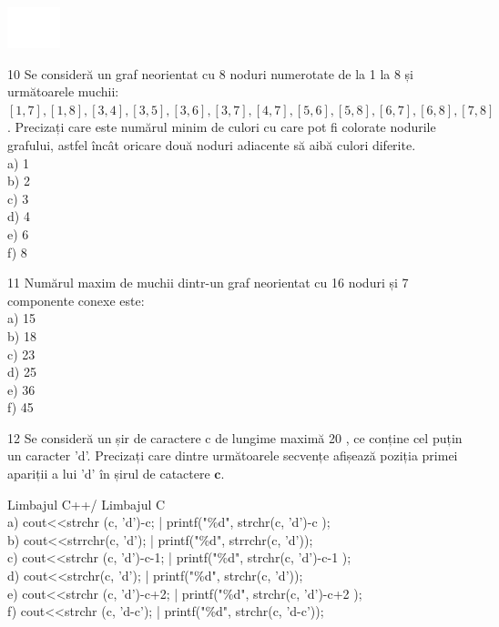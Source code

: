 \documentclass[10pt]{article}
\begin{document}
\includegraphics[max width=\textwidth, center]{2025_04_17_46e04c6acd873ea9558dg-016}

10 Se consideră un graf neorientat cu 8 noduri numerotate de la 1 la 8 și următoarele muchii: $[1,7],[1,8],[3,4],[3,5],[3,6],[3,7],[4,7],[5,6],[5,8],[6,7],[6,8],[7,8]$. Precizați care este numărul minim de culori cu care pot fi colorate nodurile grafului, astfel încât oricare două noduri adiacente să aibă culori diferite.\\
a) 1\\
b) 2\\
c) 3\\
d) 4\\
e) 6\\
f) 8

11 Numărul maxim de muchii dintr-un graf neorientat cu 16 noduri și 7 componente conexe este:\\
a) 15\\
b) 18\\
c) 23\\
d) 25\\
e) 36\\
f) 45

12 Se consideră un șir de caractere c de lungime maximă 20 , ce conține cel puțin un caracter 'd'. Precizați care dintre următoarele secvențe afișează poziția primei apariții a lui 'd' în șirul de catactere $\mathbf{c}$.

Limbajul C++/ Limbajul C\\
a) cout<<strchr (c, 'd')-c; | printf("\%d", strchr(c, 'd')-c );\\
b) cout<<strrchr(c, 'd'); | printf("\%d", strrchr(c, 'd'));\\
c) cout<<strchr (c, 'd')-c-1; | printf("\%d", strchr(c, 'd')-c-1 );\\
d) cout<<strchr(c, 'd'); | printf("\%d", strchr(c, 'd'));\\
e) cout<<strchr (c, 'd')-c+2; | printf("\%d", strchr(c, 'd')-c+2 );\\
f) cout<<strchr (c, 'd-c'); | printf("\%d", strchr(c, 'd-c'));
\end{document}
